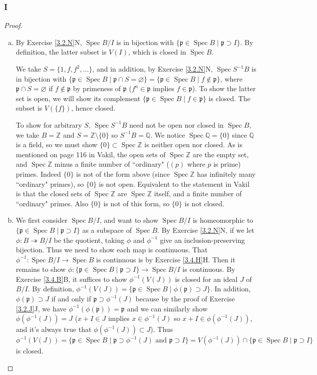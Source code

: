 \documentclass{article}
\newcommand{\Z}{\mathbb{Z}}
\newcommand{\Q}{\mathbb{Q}}
\newcommand{\frkp}{\mathfrak{p}}
\DeclareMathOperator{\Spec}{\mathrm{Spec}}
\let\emptyset\varnothing
\theoremstyle{definition} %
\begin{document}
\subsubsection{I}\label{3.4.I}
\begin{proof}
    \begin{enumerate}[(a)]
        \item By Exercise \ref{3.2.N}N, $\Spec B/I$ is in bijection with $\{ \frkp \in \Spec B \mid \frkp \supset I\}$. By definition, the latter subset is $V(I)$, which is closed in $\Spec B$.
        
        We take $S=\{1,f,f^2,\dots\}$, and in addition, by Exercise \ref{3.2.N}N, $\Spec S^{-1} B$ is in bijection with $\{ \frkp \in \Spec B \mid \frkp \cap S = \emptyset \} =\{ \frkp \in \Spec B \mid f\notin \frkp \}$, where $\frkp \cap S = \emptyset$ if $f \notin \frkp$ by primeness of $\frkp$ ($f^n \in \frkp$ implies $f\in \frkp$). To show the latter set is open, we will show its complement $\{\frkp \in \Spec B \mid f \in \frkp \}$ is closed. The subset is $V(\{f\})$, hence closed.

        To show for arbitrary $S$, $\Spec S^{-1}B$ need not be open nor closed in $\Spec B$, we take $B=\Z$ and $S=\Z\setminus \{0\}$ so $S^{-1}B=\Q$. We notice $\Spec \Q = \{ 0\}$ since $\Q$ is a field, so we must show $\{0\}\subset \Spec \Z$ is neither open nor closed. As is mentioned on page 116 in Vakil, the open sets of $\Spec \Z$ are the empty set, and $\Spec \Z$ minus a finite number of ``ordinary" ($(p)$ where $p$ is prime) primes. Indeed $\{0\}$ is not of the form above (since $\Spec \Z$ has infinitely many ``ordinary" primes), so $\{0\}$ is not open. Equivalent to the statement in Vakil is that the closed sets of $\Spec \Z$ are $\Spec \Z$ itself, and a finite number of ``ordinary" primes. Also $\{0\}$ is not of this form, so $\{0\}$ is not closed.
        \item We first consider $\Spec B/I$, and want to show $\Spec B/I$ is homeomorphic to $\{ \frkp \in \Spec B \mid \frkp \supset I\}$ as a subspace of $\Spec B$. By Exercise \ref{3.2.N}N, if we let $\phi:B\twoheadrightarrow B/I$ be the quotient, taking $\phi$ and $\phi^{-1}$ give an inclusion-preserving bijection. Thus we need to show each map is continuous. That $\phi^{-1}:\Spec B/I \to \Spec B$ is continuous is by Exercise \ref{3.4.H}H. Then it remains to show $\phi:\{ \frkp \in \Spec B \mid \frkp \supset I\}\to \Spec B/I$ is continuous. By Exercise \ref{3.4.B}B, it suffices to show $\phi^{-1}(V(J))$ is closed for an ideal $J$ of $B/I$. By definition, $\phi^{-1}(V(J))=\{\frkp \in \Spec B \mid \phi(\frkp)\supset J\}$. In addition, $\phi(\frkp)\supset J$ if and only if $\frkp \supset \phi^{-1}(J)$ because by the proof of Exercise \ref{3.2.J}J, we have $\phi^{-1}(\phi(\frkp))=\frkp$ and we can similarly show $\phi(\phi^{-1}(J))=J$ ($x+I\in J$ implies $x\in \phi^{-1}(J)$ so $x+I \in \phi(\phi^{-1}(J))$, and it's always true that $\phi(\phi^{-1}(J))\subset J$). Thus $\phi^{-1}(V(J))=\{\frkp \in \Spec B \mid \frkp \supset \phi^{-1}(J) \text{ and } \frkp \supset I\}=V(\phi^{-1}(J))\cap \{ \frkp \in \Spec B \mid \frkp \supset I\}$ is closed.


\end{enumerate}
\end{proof}
\end{document}
